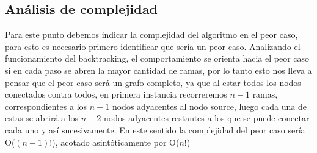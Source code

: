 \newpage
\subsection{An\'alisis de complejidad}

Para este punto debemos indicar la complejidad del algoritmo en el peor caso, para esto es necesario primero identificar que ser\'ia un peor caso.
Analizando el funcionamiento del backtracking, el comportamiento se orienta hacia el peor caso si en cada paso se abren la mayor cantidad de ramas, por lo tanto esto nos lleva a pensar que el peor caso ser\'a un grafo completo, ya que al estar todos los nodos conectados contra todos, en primera instancia recorreremos $n-1$ ramas, correspondientes a los $n-1$ nodos adyacentes al nodo source, luego cada una de estas se abrir\'a a los $n-2$ nodos adyacentes restantes a los que se puede conectar cada uno y as\'i sucesivamente. En este sentido la complejidad del peor caso ser\'ia O($(n-1)!$), acotado asint\'oticamente por O($n!$)





